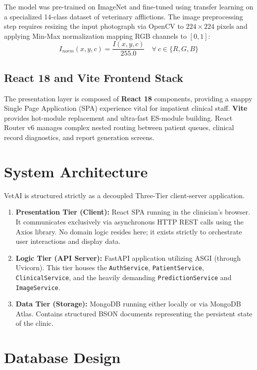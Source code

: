 \documentclass[a4paper,12pt]{report}
\begin{document}
The model was pre-trained on ImageNet and fine-tuned using transfer learning on a specialized 14-class dataset of veterinary afflictions. The image preprocessing step requires resizing the input photograph via OpenCV to $224 \times 224$ pixels and applying Min-Max normalization mapping RGB channels to $[0, 1]$:
\begin{equation}
I_{norm}(x, y, c) = \frac{I(x, y, c)}{255.0} \quad \forall \ c \in \{R, G, B\}
\label{eq:image_norm}
\end{equation}

\subsection{React 18 and Vite Frontend Stack}

The presentation layer is composed of \textbf{React 18} components, providing a snappy Single Page Application (SPA) experience vital for impatient clinical staff. \textbf{Vite} provides hot-module replacement and ultra-fast ES-module building. React Router v6 manages complex nested routing between patient queues, clinical record diagnostics, and report generation screens.

\section{System Architecture}

VetAI is structured strictly as a decoupled Three-Tier client-server application. 

\begin{enumerate}
    \item \textbf{Presentation Tier (Client):} React SPA running in the clinician's browser. It communicates exclusively via asynchronous HTTP REST calls using the Axios library. No domain logic resides here; it exists strictly to orchestrate user interactions and display data.
    \item \textbf{Logic Tier (API Server):} FastAPI application utilizing ASGI (through Uvicorn). This tier houses the \texttt{AuthService}, \texttt{PatientService}, \texttt{ClinicalService}, and the heavily demanding \texttt{PredictionService} and \texttt{ImageService}.
    \item \textbf{Data Tier (Storage):} MongoDB running either locally or via MongoDB Atlas. Contains structured BSON documents representing the persistent state of the clinic.
\end{enumerate}

\section{Database Design}
\end{document}
